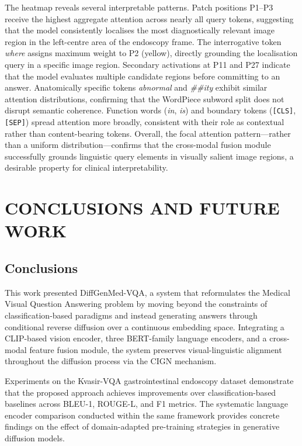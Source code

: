 \documentclass[9pt]{report}
\begin{document}
The heatmap reveals several interpretable patterns. Patch positions P1--P3 receive the highest aggregate attention across nearly all query tokens, suggesting that the model consistently localises the most diagnostically relevant image region in the left-centre area of the endoscopy frame. The interrogative token \textit{where} assigns maximum weight to P2 (yellow), directly grounding the localisation query in a specific image region. Secondary activations at P11 and P27 indicate that the model evaluates multiple candidate regions before committing to an answer. Anatomically specific tokens \textit{abnormal} and \textit{\#\#ity} exhibit similar attention distributions, confirming that the WordPiece subword split does not disrupt semantic coherence. Function words (\textit{in}, \textit{is}) and boundary tokens (\texttt{[CLS]}, \texttt{[SEP]}) spread attention more broadly, consistent with their role as contextual rather than content-bearing tokens. Overall, the focal attention pattern---rather than a uniform distribution---confirms that the cross-modal fusion module successfully grounds linguistic query elements in visually salient image regions, a desirable property for clinical interpretability.

\chapter{CONCLUSIONS AND FUTURE WORK}
\label{chap:conclusions}

\section{Conclusions}

This work presented DiffGenMed-VQA, a system that reformulates the Medical Visual Question Answering problem by moving beyond the constraints of classification-based paradigms and instead generating answers through conditional reverse diffusion over a continuous embedding space. Integrating a CLIP-based vision encoder, three BERT-family language encoders, and a cross-modal feature fusion module, the system preserves visual-linguistic alignment throughout the diffusion process via the CIGN mechanism.

Experiments on the Kvasir-VQA gastrointestinal endoscopy dataset demonstrate that the proposed approach achieves improvements over classification-based baselines across BLEU-1, ROUGE-L, and F1 metrics. The systematic language encoder comparison conducted within the same framework provides concrete findings on the effect of domain-adapted pre-training strategies in generative diffusion models.
\end{document}
